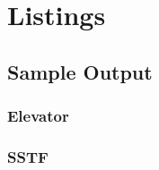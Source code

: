 \documentclass[12pt]{report}
\begin{document}
\section{Listings} %
%
%
%
%
%
%
%
%
\subsection{Sample Output}
\subsubsection{Elevator}

\subsubsection{SSTF}

\end{document}
